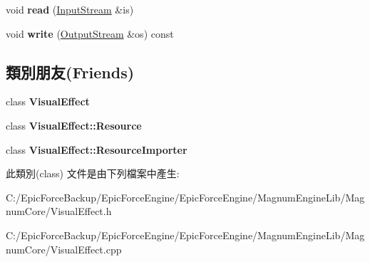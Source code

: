 \begin{DoxyCompactItemize}
\item 
void {\bfseries read} (\hyperlink{class_magnum_1_1_input_stream}{Input\+Stream} \&is)\hypertarget{class_magnum_1_1_visual_effect_1_1_pass_a208c7aade3ce2e216ea7df8b1c88266a}{}\label{class_magnum_1_1_visual_effect_1_1_pass_a208c7aade3ce2e216ea7df8b1c88266a}

\item 
void {\bfseries write} (\hyperlink{class_magnum_1_1_output_stream}{Output\+Stream} \&os) const \hypertarget{class_magnum_1_1_visual_effect_1_1_pass_a3648190c6c54753ce51e63ccad2e5837}{}\label{class_magnum_1_1_visual_effect_1_1_pass_a3648190c6c54753ce51e63ccad2e5837}

\end{DoxyCompactItemize}
\subsection*{類別朋友(Friends)}
\begin{DoxyCompactItemize}
\item 
class {\bfseries Visual\+Effect}\hypertarget{class_magnum_1_1_visual_effect_1_1_pass_ad19546ee8a8868c73e6f88564fb88462}{}\label{class_magnum_1_1_visual_effect_1_1_pass_ad19546ee8a8868c73e6f88564fb88462}

\item 
class {\bfseries Visual\+Effect\+::\+Resource}\hypertarget{class_magnum_1_1_visual_effect_1_1_pass_a7e5f0c0359cb7300a876070f845cb939}{}\label{class_magnum_1_1_visual_effect_1_1_pass_a7e5f0c0359cb7300a876070f845cb939}

\item 
class {\bfseries Visual\+Effect\+::\+Resource\+Importer}\hypertarget{class_magnum_1_1_visual_effect_1_1_pass_a316a2d14e00fb787148dd7c1f760c78c}{}\label{class_magnum_1_1_visual_effect_1_1_pass_a316a2d14e00fb787148dd7c1f760c78c}

\end{DoxyCompactItemize}


此類別(class) 文件是由下列檔案中產生\+:\begin{DoxyCompactItemize}
\item 
C\+:/\+Epic\+Force\+Backup/\+Epic\+Force\+Engine/\+Epic\+Force\+Engine/\+Magnum\+Engine\+Lib/\+Magnum\+Core/Visual\+Effect.\+h\item 
C\+:/\+Epic\+Force\+Backup/\+Epic\+Force\+Engine/\+Epic\+Force\+Engine/\+Magnum\+Engine\+Lib/\+Magnum\+Core/Visual\+Effect.\+cpp\end{DoxyCompactItemize}
